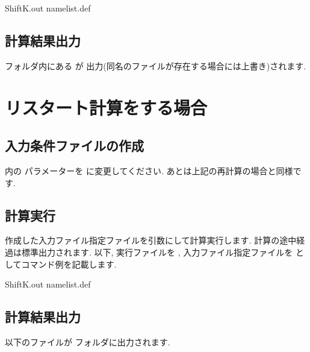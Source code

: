 \documentclass[letterpaper,10pt,dvipdfmx,openany]{sphinxmanual}
\begin{document}
\begin{sphinxVerbatim}[commandchars=\\\{\}]
\PYGZdl{} ShiftK.out namelist.def
\end{sphinxVerbatim}


\subsection{計算結果出力}
\label{\detokenize{shiftk_flow_ja:id11}}
 フォルダ内にある  が
出力(同名のファイルが存在する場合には上書き)されます.


\section{リスタート計算をする場合}
\label{\detokenize{shiftk_flow_ja:id12}}

\subsection{入力条件ファイルの作成}
\label{\detokenize{shiftk_flow_ja:id13}}
 内の  パラメーターを  に変更してください.
あとは上記の再計算の場合と同様です.


\subsection{計算実行}
\label{\detokenize{shiftk_flow_ja:id14}}
作成した入力ファイル指定ファイルを引数にして計算実行します.
計算の途中経過は標準出力されます.  以下, 実行ファイルを 
,
入力ファイル指定ファイルを  としてコマンド例を記載します.

\begin{sphinxVerbatim}[commandchars=\\\{\}]
\PYGZdl{} ShiftK.out namelist.def
\end{sphinxVerbatim}


\subsection{計算結果出力}
\label{\detokenize{shiftk_flow_ja:id15}}
以下のファイルが  フォルダに出力されます.

\begin{sphinxVerbatim}[commandchars=\\\{\}]
  
\end{sphinxVerbatim}
\end{document}

